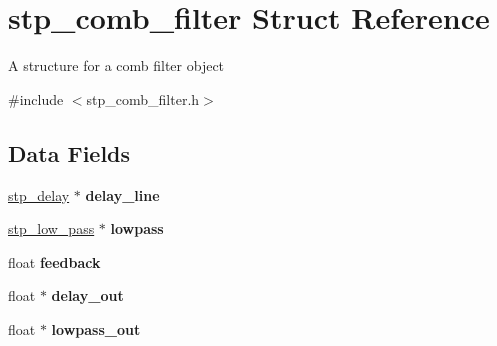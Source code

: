 \hypertarget{structstp__comb__filter}{}\section{stp\+\_\+comb\+\_\+filter Struct Reference}
\label{structstp__comb__filter}


A structure for a comb filter object ~\newline
  




{\ttfamily \#include $<$stp\+\_\+comb\+\_\+filter.\+h$>$}

\subsection*{Data Fields}
\begin{DoxyCompactItemize}
\item 
\mbox{\label{structstp__comb__filter_a15ce93a49bbc5e4c3d307185c1ae027f}} 
\hyperlink{structstp__delay}{stp\+\_\+delay} $\ast$ {\bfseries delay\+\_\+line}
\item 
\mbox{\label{structstp__comb__filter_a09ee4500695189a3c8911b597fed98b0}} 
\hyperlink{structstp__low__pass}{stp\+\_\+low\+\_\+pass} $\ast$ {\bfseries lowpass}
\item 
\mbox{\label{structstp__comb__filter_af5751b04978c100c5e39d3d7edb2e147}} 
float {\bfseries feedback}
\item 
\mbox{\label{structstp__comb__filter_a1ce1875cb317f95d9e68d149e7205448}} 
float $\ast$ {\bfseries delay\+\_\+out}
\item 
\mbox{\label{structstp__comb__filter_a9bb7f9ad439157731e1757f4b31965bb}} 
float $\ast$ {\bfseries lowpass\+\_\+out}
\end{DoxyCompactItemize}
